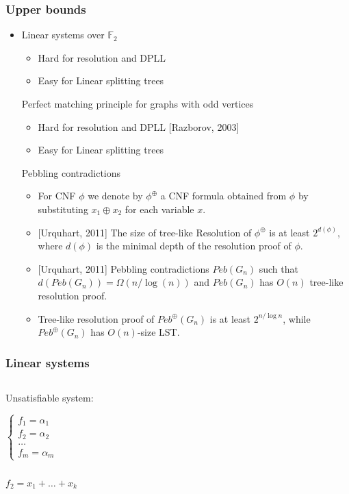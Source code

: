 \begin{frame}
    \frametitle{Upper bounds}

    \begin{itemize}
		\item Linear systems over $\mathbb{F}_2$
			\begin{itemize}
				\item Hard for resolution and DPLL
				\item Easy for Linear splitting trees
			\end{itemize}
		\pitem Perfect matching principle for graphs with odd vertices
			\begin{itemize}
				\item Hard for resolution and DPLL [Razborov, 2003]
				\item Easy for Linear splitting trees
			\end{itemize}
		\pitem Pebbling contradictions
			\begin{itemize}
				\item For CNF $\phi$ we denote by $\phi^{\oplus}$ a CNF formula
	            	obtained from $\phi$ by substituting $x_1\oplus x_2$ for each
	                variable $x$. 
				\item{} [Urquhart, 2011] The size of tree-like Resolution of
		            $\phi^{\oplus}$ is at least $2^{d(\phi)}$, where $d(\phi)$ is the
                    minimal depth of the resolution proof of $\phi$.
				\item{} [Urquhart, 2011] Pebbling contradictions $Peb(G_n)$ such that
		            $d(Peb(G_n)) = \Omega(n / \log(n))$ and $Peb(G_n)$ has $O(n)$
                    tree-like resolution proof. 
				\item Tree-like resolution proof of $Peb^\oplus(G_n)$ is at least
		            $2^{n / \log n}$, while $Peb^\oplus(G_n)$ has $O(n)$-size LST. 
			\end{itemize}
	\end{itemize}
\end{frame}




\begin{frame}
    \frametitle{Linear systems}

    \begin{columns}
		\begin{column}{1cm}
			Unsatisfiable system:

			$\left\{ \begin{aligned}
				f_1 = \alpha_1 \\
				f_2 = \alpha_2 \\
				\dots\\
				f_m = \alpha_m
			\end{aligned}\right.$
		\end{column}


		\begin{column}{9cm}
			
		\end{column}
	\end{columns}

	$f_2 = x_1 + \dots + x_k$
\end{frame}


